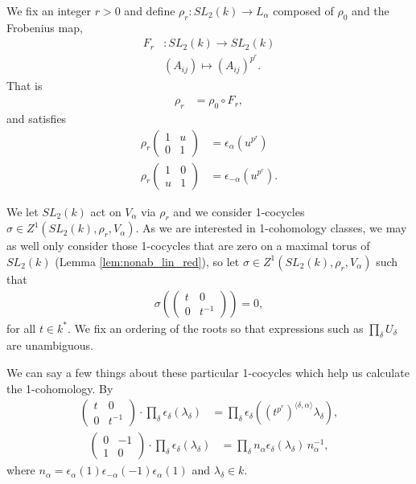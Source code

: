 We fix an integer $r > 0$ and define $\rho_r:SL_2(k) \rightarrow L_\alpha$ composed of $\rho_0$ and the Frobenius map,
\begin{align*}
F_r&:SL_2(k)\rightarrow SL_2(k) \\
& (A_{ij}) \mapsto (A_{ij})^{p^r}.
\end{align*}
That is
\begin{align*}
\rho_r &= \rho_0 \circ F_r,
\end{align*}
and satisfies
\begin{align*}
\rho_r \left(\begin{matrix} 1 &  u \\ 0 & 1 \end{matrix} \right) &= \epsilon_\alpha(u^{p^r}) \\
\rho_r \left(\begin{matrix} 1 & 0 \\ u & 1 \end{matrix} \right) &= \epsilon_{-\alpha}(u^{p^r}).
\end{align*}

We let $SL_2(k)$ act on $V_\alpha$ via $\rho_r$ and we consider 1-cocycles $\sigma \in Z^1(SL_2(k), \rho_r, V_\alpha)$. As we are interested in 1-cohomology classes, we may as well only consider those 1-cocycles that are zero on a maximal torus of $SL_2(k)$ (Lemma \ref{lem:nonab_lin_red}), so let $\sigma \in Z^1(SL_2(k), \rho_r, V_\alpha)$ such that
\begin{align*}
\sigma\left(\left(\begin{matrix} t & 0 \\ 0 & t^{-1}\end{matrix}\right)\right) = 0,
\end{align*}
for all $t\in k^*$.
We fix an ordering of the roots so that expressions such as $\prod_\delta U_\delta$ are unambiguous.

We can say a few things about these particular 1-cocycles which help us calculate the 1-cohomology.  By \cite[Theorem 26.3(c)]{humphreys1975linear}
\begin{align}
\left(\begin{matrix} t & 0 \\ 0 & t^{-1}\end{matrix}\right) \cdot \prod_\delta \epsilon_\delta (\lambda_\delta) &=
\prod_\delta \epsilon_\delta\left( (t^{p^r})^{\langle \delta, \alpha\rangle}\lambda_\delta\right),
\label{eqn:t_act}
\end{align}
\begin{align}
\left(\begin{matrix} 0 & -1 \\ 1 & 0 \end{matrix}\right) \cdot \prod_\delta \epsilon_\delta (\lambda_\delta) &=
\prod_\delta n_\alpha \epsilon_\delta\left( \lambda_\delta\right)\, n_\alpha^{-1},
\label{eqn:n_act}
\end{align}
where $n_\alpha = \epsilon_\alpha(1)\epsilon_{-\alpha}(-1)\epsilon_\alpha(1)$ and $\lambda_\delta \in k$.

